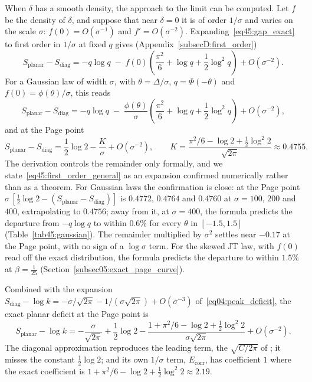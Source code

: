 \documentclass[11pt,letterpaper]{article}
\theoremstyle{plain}
\theoremstyle{definition}
\theoremstyle{remark}
\begin{document}
When $\delta$ has a smooth density, the approach to the limit can be computed. Let $f$ be the density of $\delta$, and suppose that near $\delta = 0$ it is of order $1/\sigma$ and varies on the scale $\sigma$: $f(0) = O(\sigma^{-1})$ and $f' = O(\sigma^{-2})$. Expanding~\eqref{eq45:gap_exact} to first order in $1/\sigma$ at fixed $q$ gives (Appendix~\ref{subsecD:first_order})
\begin{equation}
\label{eq45:first_order_general}
S_{\mathrm{planar}} - S_{\mathrm{diag}} = -q\log q \;-\; f(0)\left(\frac{\pi^2}{6} + \log q + \frac12 \log^2 q\right) + O(\sigma^{-2}).
\end{equation}
For a Gaussian law of width $\sigma$, with $\theta = \Delta/\sigma$, $q = \Phi(-\theta)$ and $f(0) = \phi(\theta)/\sigma$, this reads
\begin{equation}
\label{eq45:first_order}
S_{\mathrm{planar}} - S_{\mathrm{diag}} = -q\log q \;-\; \frac{\phi(\theta)}{\sigma}\left(\frac{\pi^2}{6} + \log q + \frac12 \log^2 q\right) + O(\sigma^{-2}),
\end{equation}
and at the Page point
\begin{equation}
\label{eq45:first_order_page}
S_{\mathrm{planar}} - S_{\mathrm{diag}} = \frac12\log 2 - \frac{K}{\sigma} + O(\sigma^{-2}), \qquad K = \frac{\pi^2/6 - \log 2 + \tfrac12\log^2 2}{\sqrt{2\pi}} \approx 0.4755 .
\end{equation}
The derivation controls the remainder only formally, and we state~\eqref{eq45:first_order_general} as an expansion confirmed numerically rather than as a theorem. For Gaussian laws the confirmation is close: at the Page point $\sigma\,[\tfrac12\log 2 - (S_{\mathrm{planar}} - S_{\mathrm{diag}})]$ is $0.4772$, $0.4764$ and $0.4760$ at $\sigma = 100$, $200$ and $400$, extrapolating to $0.4756$; away from it, at $\sigma = 400$, the formula predicts the departure from $-q\log q$ to within $0.6\%$ for every $\theta$ in $[-1.5, 1.5]$ (Table~\ref{tab45:gaussian}). The remainder multiplied by $\sigma^2$ settles near $-0.17$ at the Page point, with no sign of a $\log\sigma$ term. For the skewed JT law, with $f(0)$ read off the exact distribution, the formula predicts the departure to within $1.5\%$ at $\beta = \tfrac1{25}$ (Section~\ref{subsec05:exact_page_curve}).

Combined with the expansion $S_{\mathrm{diag}} - \log k = -\sigma/\sqrt{2\pi} - 1/(\sigma\sqrt{2\pi}) + O(\sigma^{-3})$ of~\eqref{eq04:peak_deficit}, the exact planar deficit at the Page point is
\begin{equation}
\label{eq45:planar_page}
S_{\mathrm{planar}} - \log k = -\frac{\sigma}{\sqrt{2\pi}} + \frac12\log 2 - \frac{1 + \pi^2/6 - \log 2 + \tfrac12\log^2 2}{\sigma\sqrt{2\pi}} + O(\sigma^{-2}) .
\end{equation}
The diagonal approximation reproduces the leading term, the $\sqrt{C/2\pi}$ of \citet{murthysrednicki2019}; it misses the constant $\tfrac12\log 2$; and its own $1/\sigma$ term, $E_{\mathrm{corr}}$, has coefficient $1$ where the exact coefficient is $1 + \pi^2/6 - \log 2 + \tfrac12\log^2 2 \approx 2.19$.
\end{document}
